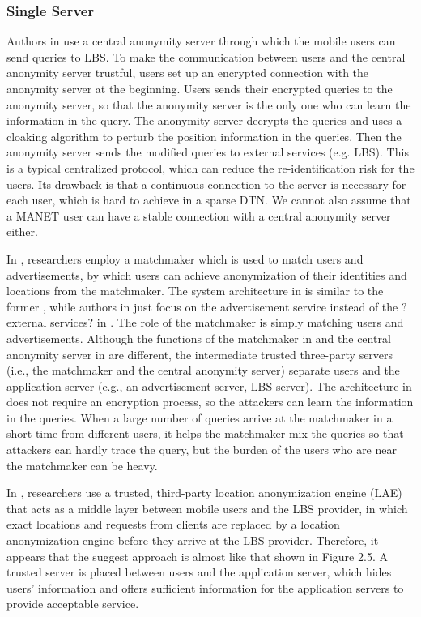 \subsubsection{ Single Server}

\noindent Authors in \cite {C15} use a central anonymity server through which the mobile users can send queries to LBS. To make the communication between users and the central anonymity server trustful, users set up an encrypted connection with the anonymity server at the beginning. Users sends their encrypted queries to the anonymity server, so that the anonymity server is the only one who can learn the information in the query. The anonymity server decrypts the queries and uses a cloaking algorithm to perturb the position information in the queries. Then the anonymity server sends the modified queries to external services (e.g. LBS). This is a typical centralized protocol, which can reduce the re-identification risk for the users. Its drawback is that a continuous connection to the server is necessary for each user, which is hard to achieve in a sparse DTN. We cannot also assume that a MANET user can have a stable connection with a central anonymity server either.

In \cite {C23}, researchers employ a matchmaker which is used to match users and advertisements, by which users can achieve anonymization of their identities and locations from the matchmaker. The system architecture in \cite {C23} is similar to the former \cite {C15}, while authors in \cite {C23} just focus on the advertisement service instead of the ?external services? in \cite{C15}. The role of the matchmaker is simply matching users and advertisements. Although the functions of the matchmaker in \cite {C23} and the central anonymity server in \cite {C15} are different, the intermediate trusted three-party servers (i.e., the matchmaker and the central anonymity server) separate users and the application server (e.g., an advertisement server, LBS server). The architecture in \cite {C23} does not require an encryption process, so the attackers can learn the information in the queries. When a large number of queries arrive at the matchmaker in a short time from different users, it helps the matchmaker mix the queries so that attackers can hardly trace the query, but the burden of the users who are near the matchmaker can be heavy.

In \cite {C24}, researchers use a trusted, third-party location anonymization engine (LAE) that acts as a middle layer between mobile users and the LBS provider, in which exact locations and requests from clients are replaced by a location anonymization engine before they arrive at the LBS provider. Therefore, it appears that the suggest approach is almost like that shown in Figure 2.5. A trusted server is placed between users and the application server, which hides users' information and offers sufficient information for the application servers to provide acceptable service. 

